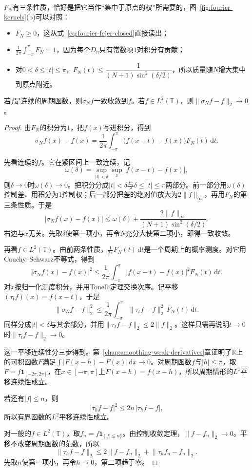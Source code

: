 $F_N$有三条性质，恰好是把它当作“集中于原点的权”所需要的，图~\ref{fig:fourier-kernels}(b)可以对照：
\begin{itemize}
\item $F_N\geq0$，这从式~\eqref{eq:fourier-fejer-closed}直接读出；
\item $\frac1{2\pi}\int_{-\pi}^{\pi}F_N=1$，因为每个$D_n$只有常数项$1$对积分有贡献；
\item 对$0<\delta\leq\lvert t\rvert\leq\pi$，$F_N(t)\leq\dfrac1{(N+1)\sin^2(\delta/2)}$，所以质量随$N$增大集中到原点附近。
\end{itemize}

\begin{lemma}[Fejér平均的收敛]
\label{lem:fourier-fejer}
若$f$是连续的周期函数，则$\sigma_Nf$一致收敛到$f$。若$f\in L^2(\mathbb T)$，则$\lVert\sigma_Nf-f\rVert_2\to0$。
\end{lemma}

\begin{proof}
由$F_N$的积分为$1$，把$f(x)$写进积分，得到
\[
\sigma_Nf(x)-f(x)=\frac1{2\pi}\int_{-\pi}^{\pi}\bigl(f(x-t)-f(x)\bigr)F_N(t)\,\mathrm dt.
\]

先看连续的$f$。它在紧区间上一致连续，记
\[
\omega(\delta)=\sup_{\lvert t\rvert<\delta}\sup_x\lvert f(x-t)-f(x)\rvert,
\]
则$\delta\to0$时$\omega(\delta)\to0$。把积分分成$\lvert t\rvert<\delta$与$\delta\leq\lvert t\rvert\leq\pi$两部分。前一部分用$\omega(\delta)$控制差、用积分为$1$控制权；后一部分把差的绝对值放大为$2\lVert f\rVert_\infty$，再用$F_N$的第三条性质。于是
\[
\lvert\sigma_Nf(x)-f(x)\rvert\leq\omega(\delta)+\frac{2\lVert f\rVert_\infty}{(N+1)\sin^2(\delta/2)}.
\]
右边与$x$无关。先取$\delta$使第一项小，再令$N$充分大使第二项小，即得一致收敛。

再看$f\in L^2(\mathbb T)$。由前两条性质，$\frac1{2\pi}F_N(t)\,\mathrm dt$是一个周期上的概率测度。对它用Cauchy--Schwarz不等式，得到
\[
\lvert\sigma_Nf(x)-f(x)\rvert^2\leq\frac1{2\pi}\int_{-\pi}^{\pi}\lvert f(x-t)-f(x)\rvert^2F_N(t)\,\mathrm dt.
\]
对$x$按归一化测度积分，并用Tonelli定理交换次序。记平移$(\tau_tf)(x)=f(x-t)$，于是
\[
\lVert\sigma_Nf-f\rVert_2^2\leq\frac1{2\pi}\int_{-\pi}^{\pi}\lVert\tau_tf-f\rVert_2^2\,F_N(t)\,\mathrm dt.
\]
同样分成$\lvert t\rvert<\delta$与其余部分，并用$\lVert\tau_tf-f\rVert_2\leq2\lVert f\rVert_2$。这样只需再说明$t\to0$时$\lVert\tau_tf-f\rVert_2\to0$。

这一平移连续性分三步得到。第~\ref{chap:smoothing-weak-derivatives}章证明了$\mathbb R$上的可积函数$F$满足$\int\lvert F(x-h)-F(x)\rvert\,\mathrm dx\to0$。对周期函数$f$与$\lvert h\rvert\leq\pi$，取$F=f\mathbf 1_{[-2\pi,2\pi]}$，在$x\in[-\pi,\pi]$上$F(x-h)=f(x-h)$，所以周期情形的$L^1$平移连续性成立。

若还有$\lvert f\rvert\leq n$，则
\[
\lvert\tau_hf-f\rvert^2\leq2n\,\lvert\tau_hf-f\rvert,
\]
所以有界函数的$L^2$平移连续性成立。

对一般的$f\in L^2(\mathbb T)$，取$f_n=f\mathbf 1_{\{\lvert f\rvert\leq n\}}$。由控制收敛定理，$\lVert f-f_n\rVert_2\to0$。平移不改变周期函数的范数，所以
\[
\lVert\tau_hf-f\rVert_2\leq2\lVert f-f_n\rVert_2+\lVert\tau_hf_n-f_n\rVert_2.
\]
先取$n$使第一项小，再令$h\to0$，第二项趋于零。
\end{proof}

